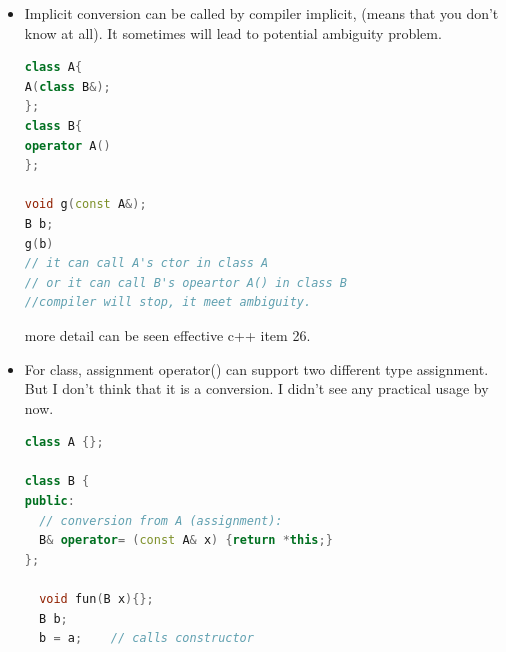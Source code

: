 \documentclass[a4paper,12pt,twoside]{book}
\begin{document}
\begin{itemize}
\item Implicit conversion can be called by compiler implicit, (means that you don't know at all). It sometimes will lead to potential ambiguity problem.
\begin{lstlisting}[frame=single, language=c++]
class A{
A(class B&);
};
class B{
operator A()
};

void g(const A&);
B b;
g(b)
// it can call A's ctor in class A
// or it can call B's opeartor A() in class B
//compiler will stop, it meet ambiguity.
\end{lstlisting}
more detail can be seen effective c++ item 26.

\item For class, assignment operator() can support two different type assignment. But I don't think that it is a conversion. I didn't see any practical usage by now. 
\begin{lstlisting}[frame=single, language=c++]
class A {};

class B {
public:
  // conversion from A (assignment):
  B& operator= (const A& x) {return *this;}
};

  void fun(B x){};
  B b;
  b = a;    // calls constructor
\end{lstlisting}

\end{itemize}
\end{document}
